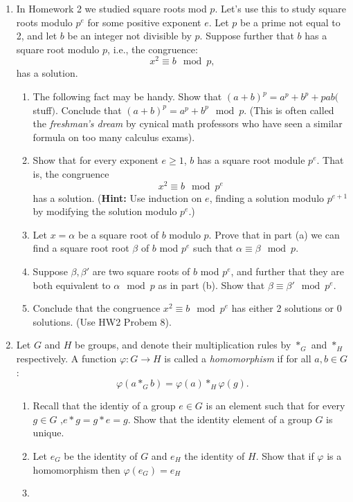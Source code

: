 \documentclass[11pt]{article}
\begin{document}
\begin{enumerate}
{  }
  \item{
  In Homework 2 we studied square roots mod $p$.  Let's use this to study square roots modulo $p^e$ for some positive exponent $e$.  Let $p$ be a prime not equal to 2, and let $b$ be an integer not divisible by $p$.  Suppose further that $b$ has a square root modulo $p$, i.e., the congruence:
  \[x^2\equiv b\mod p,\]
  has a solution.
  \begin{enumerate}
    \item{The following fact may be handy.  Show that $(a+b)^p = a^p + b^p + pab($stuff$)$.  Conclude that  $(a+b)^p = a^p+b^p\mod p$.  (This is often called the \textit{freshman's dream} by cynical math professors who have seen a similar formula on too many calculus exams).
    }
    \item{
    Show that for every exponent $e\ge 1$, $b$ has a square root module $p^e$.  That is, the congruence
    \[x^2\equiv b\mod p^e\]
    has a solution.  (\textbf{Hint:} Use induction on $e$, finding a solution modulo $p^{e+1}$ by modifying the solution modulo $p^e$.)
    }
    \item{
    Let $x=\alpha$ be a square root of $b$ modulo $p$.  Prove that in part (a) we can find a square root root $\beta$ of $b$ mod $p^e$ such that $\alpha\equiv\beta\mod p$.
    }
    \item{
    Suppose $\beta,\beta'$ are two square roots of $b$ mod $p^e$, and further that they are both equivalent to $\alpha\mod p$ as in part (b).  Show that $\beta\equiv\beta'\mod p^e$.
    }
    \item{
    Conclude that the congruence $x^2\equiv b\mod p^e$ has either 2 solutions or 0 solutions.  (Use HW2 Probem 8).
    }
  \end{enumerate}
  }
  \item{
  Let $G$ and $H$ be groups, and denote their multiplication rules by $*_G$ and $*_H$ respectively.  A function $\varphi:G\to H$ is called a \textit{homomorphism} if for all $a,b\in G$:
  \[\varphi(a*_G b) = \varphi(a)*_H\varphi(g).\]
  \begin{enumerate}
    \item{
    Recall that the identiy of a group $e\in G$ is an element such that for every $g\in G$ ,$e*g=g*e=g$.  Show that the identity element of a group $G$ is unique.
    }
    \item{
    Let $e_G$ be the identity of $G$ and $e_H$ the identity of $H$.  Show that if $\varphi$ is a homomorphism then $\varphi(e_G) = e_H$
    }
    \item{
}
\end{enumerate}}
\end{enumerate}
\end{document}
